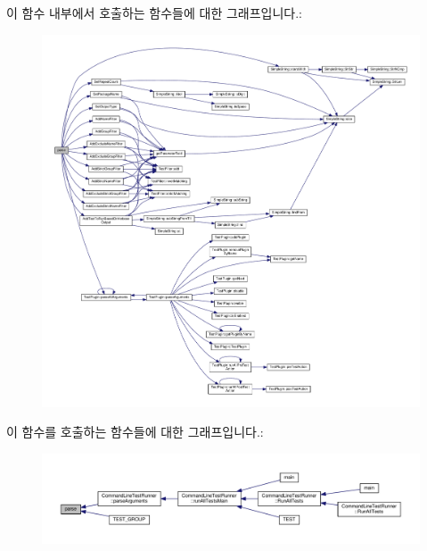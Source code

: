 이 함수 내부에서 호출하는 함수들에 대한 그래프입니다.\+:
\nopagebreak
\begin{figure}[H]
\begin{center}
\leavevmode
\includegraphics[width=350pt]{class_command_line_arguments_a22a7007b1b3c05911d5ff75e9414f3cb_cgraph}
\end{center}
\end{figure}




이 함수를 호출하는 함수들에 대한 그래프입니다.\+:
\nopagebreak
\begin{figure}[H]
\begin{center}
\leavevmode
\includegraphics[width=350pt]{class_command_line_arguments_a22a7007b1b3c05911d5ff75e9414f3cb_icgraph}
\end{center}
\end{figure}


